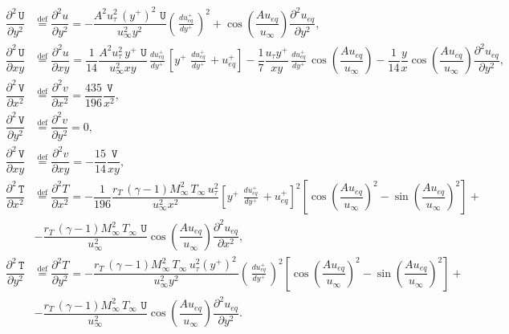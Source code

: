 \documentclass[10pt]{article}
\newcommand{\diff}[2] {\dfrac{\partial #1}{\partial #2}}
\newcommand{\U}{\,\mathtt{U}}
\newcommand{\V}{\,\mathtt{V}}
\newcommand{\T}{\,\mathtt{T}}
\newcommand{\Dueqplusyplus}{\, \frac{du_{eq}^+}{dy^+}\,}
\begin{document}
\begin{equation}
\begin{split}
\diff{^2\U}{y^2} &\stackrel{\text{def}}{=} \diff{^2 u}{y^2}= -\dfrac{ A^2  u_{\tau}^2 \, (y^{+})^2 \,  \U}{u_{\infty}^2 y^2}\left(\Dueqplusyplus\right)^2 + \cos\left(\dfrac{A u_{eq}}{u_{\infty}}\right)\diff{^2u_{eq}}{y^2} , \\  
%
%
\diff{^2\U}{xy} &\stackrel{\text{def}}{=} \diff{^2 u}{xy} = \dfrac{1}{14} \dfrac{ A^2 u_{\tau}^2 \, y^{+} \, \U}{u_{\infty}^2 x y}  \Dueqplusyplus\left[y^{+} \, \Dueqplusyplus+u_{eq}^{+}\right]-\dfrac{1}{7}  \dfrac{u_{\tau} y^{+}}{x y} \Dueqplusyplus \cos\left(\dfrac{A u_{eq}}{u_{\infty}}\right) -\dfrac{1}{14} \dfrac{ y}{x} \cos\left(\dfrac{A u_{eq}}{u_{\infty}}\right)  \diff{^2u_{eq}}{y^2}, \\
%
\diff{^2\V}{x^2} &\stackrel{\text{def}}{=}\diff{^2 v}{x^2}= \dfrac{435}{196} \dfrac{\V}{x^2} ,\\
%
\diff{^2\V}{y^2} &\stackrel{\text{def}}{=}\diff{^2 v}{y^2}= 0, \\  
%
\diff{^2\V}{xy} &\stackrel{\text{def}}{=}\diff{^2 v}{xy}= -\dfrac{15}{14} \dfrac{\V}{xy},\\  
%
\diff{^2\T}{x^2} &\stackrel{\text{def}}{=}\diff{^2 T}{x^2}= -\dfrac{1}{196} \dfrac{ r_T \, (\gamma-1) M_{\infty}^2 \, T_{\infty} \,  u_{\tau}^2}{u_{\infty}^2 x^2}\left[y^{+} \, \Dueqplusyplus + u_{eq}^{+}\right]^2  \left[\cos\left(\dfrac{A u_{eq}}{u_{\infty}}\right)^2-\sin\left(\dfrac{A u_{eq}}{u_{\infty}}\right)^2\right]+\\
  &- \dfrac{r_T \, (\gamma-1) M_{\infty}^2 \, T_{\infty} \,  \U}{u_{\infty}^2}\cos\left(\dfrac{A u_{eq}}{u_{\infty}}\right) \diff{^2u_{eq}}{x^2} , \\
\diff{^2\T}{y^2} &\stackrel{\text{def}}{=}\diff{^2 T}{y^2}= - \dfrac{r_T \, (\gamma-1) M_{\infty}^2 \, T_{\infty} \, u_{\tau}^2(y^{+})^2 \,  }{u_{\infty}^2 y^2}\left(\Dueqplusyplus\right)^2  \left[\cos\left(\dfrac{A u_{eq}}{u_{\infty}}\right)^2-\sin\left(\dfrac{A u_{eq}}{u_{\infty}}\right)^2\right]+\\
  &-\dfrac{ r_T \, (\gamma-1) M_{\infty}^2 \, T_{\infty} \,  \U}{u_{\infty}^2}\cos\left(\dfrac{A u_{eq}}{u_{\infty}}\right) \diff{^2u_{eq}}{y^2}.
%
\end{split}
\end{equation}
\end{document}
